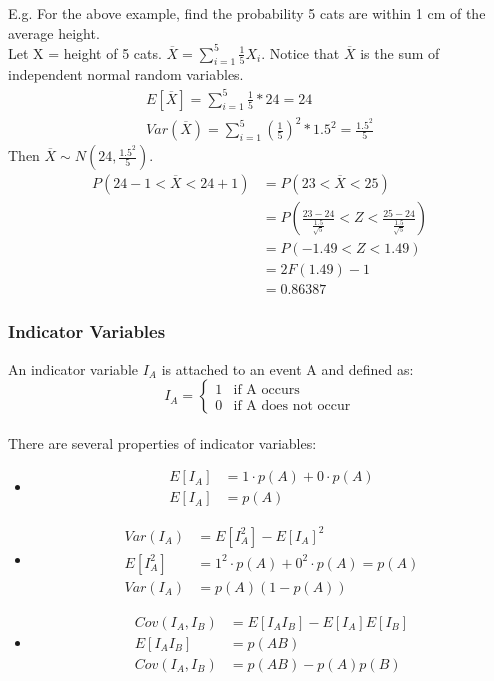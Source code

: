 \documentclass[12pt, letterpaper]{article}
\begin{document}
E.g. For the above example, find the probability 5 cats are within 1 cm of the average height.\\

Let X = height of 5 cats. $\overline{X} = \sum\limits_{i = 1}^{5} \frac{1}{5} X_i$. Notice that $\overline{X}$ is the sum of independent normal random variables.
\begin{align*}
E[\overline{X}] = \sum_{i = 1}^{5} \frac{1}{5} * 24 = 24\\
Var\left(\overline{X}\right) = \sum_{i = 1}^{5} \left(\frac{1}{5}\right)^2 * 1.5^2 = \frac{1.5^2}{5}
\end{align*}
Then $\overline{X} \sim N(24, \frac{1.5^2}{5})$.
\begin{align*}
P\left(24 - 1 < \overline{X} < 24 + 1\right) &= P\left(23 < \overline{X} < 25\right)\\
&= P\left(\frac{23 - 24}{\frac{1.5}{\sqrt{5}}} < Z < \frac{25 - 24}{\frac{1.5}{\sqrt{5}}}\right)\\
&= P\left(-1.49 < Z < 1.49\right)\\
&= 2F(1.49) - 1\\
&= 0.86387
\end{align*}

\subsubsection{Indicator Variables}
An indicator variable $I_A$ is attached to an event A and defined as:
\begin{equation}
I_A = \begin{cases}
1 & \text{if A occurs}\\
0 & \text{if A does not occur}
\end{cases}
\end{equation}\\

There are several properties of indicator variables:
\begin{itemize}
\item \begin{align*}
E[I_A] &= 1 \cdot p\left(A\right) + 0 \cdot p\left(A\right)\\
E[I_A] &= p\left(A\right)
\end{align*}
\item \begin{align*}
Var\left(I_A\right) &= E[I_A^2] - E[I_A]^2\\
E[I_A^2] &= 1^2 \cdot p\left(A\right) + 0^2 \cdot p\left(A\right) = p\left(A\right)\\
Var\left(I_A\right) &= p\left(A\right)(1 - p\left(A\right))
\end{align*}
\item \begin{align*}
Cov\left(I_A, I_B\right) &= E[I_A I_B] - E[I_A]E[I_B]\\
E[I_A I_B] &= p\left(AB\right)\\
Cov\left(I_A, I_B\right) &= p\left(AB\right) - p\left(A\right)p\left(B\right)
\end{align*}
\end{itemize}
\end{document}
